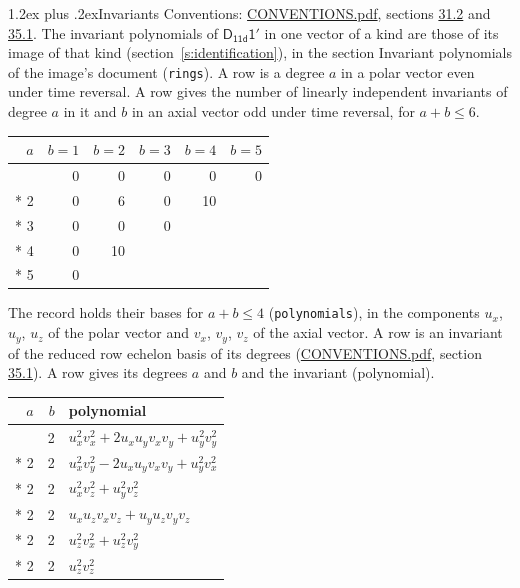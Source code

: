 \documentclass[10pt,a4paper]{article}
\makeatletter
\renewcommand\section{\@startsection{section}{1}{\z@}{-3ex plus -1ex minus -.2ex}%
  {1.2ex plus .2ex}{\normalfont\large\sffamily\bfseries\color{parttitle}}}
\numberwithin{equation}{section}
\newcommand{\grp}[1]{\mathsf{#1}}
\makeatother
\begin{document}
\section{Invariants}\label{s:invariants}
Conventions: \href{../../CONVENTIONS.pdf}{CONVENTIONS.pdf}, sections \href{../../CONVENTIONS.pdf\#conv.31.2}{31.2} and \href{../../CONVENTIONS.pdf\#conv.35.1}{35.1}.
The invariant polynomials of $\grp{D_{11d}1'}$ in one vector of a kind are those of its image of that kind (section~\ref{s:identification}), in the section Invariant polynomials of the image's document (\texttt{rings}).
\leavevmode\label{n:index.degree.polar}\label{n:index.degree.axial}A row is a degree $a$ in a polar vector even under time reversal. A row gives the number of linearly independent invariants of degree $a$ in it and $b$ in an axial vector odd under time reversal, for $a + b \le 6$.
{\small\begin{longtable}{@{}rrrrrr@{}}\toprule
$a$ & $b = 1$ & $b = 2$ & $b = 3$ & $b = 4$ & $b = 5$\\\midrule\endhead
\bottomrule\endfoot\endlastfoot
1 & 0 & 0 & 0 & 0 & 0\\*
2 & 0 & 6 & 0 & 10 & \\*
3 & 0 & 0 & 0 &  & \\*
4 & 0 & 10 &  &  & \\*
5 & 0 &  &  &  & \\
\bottomrule\end{longtable}}
\leavevmode\label{n:local.component.polar}\label{n:local.component.axial}The record holds their bases for $a + b \le 4$ (\texttt{polynomials}), in the components $u_{x}$, $u_{y}$, $u_{z}$ of the polar vector and $v_{x}$, $v_{y}$, $v_{z}$ of the axial vector. \label{n:head.polynomial}A row is an invariant of the reduced row echelon basis of its degrees (\href{../../CONVENTIONS.pdf}{CONVENTIONS.pdf}, section \href{../../CONVENTIONS.pdf\#conv.35.1}{35.1}). A row gives its degrees $a$ and $b$ and the invariant (polynomial).
{\small\renewcommand{\arraystretch}{1.2}\begin{longtable}{@{}rrl@{}}\toprule
$a$ & $b$ & polynomial\\\midrule\endhead
\bottomrule\endfoot\endlastfoot
2 & 2 & $u_{x}^{2}v_{x}^{2} + 2u_{x}u_{y}v_{x}v_{y} + u_{y}^{2}v_{y}^{2}$\\*
2 & 2 & $u_{x}^{2}v_{y}^{2} - 2u_{x}u_{y}v_{x}v_{y} + u_{y}^{2}v_{x}^{2}$\\*
2 & 2 & $u_{x}^{2}v_{z}^{2} + u_{y}^{2}v_{z}^{2}$\\*
2 & 2 & $u_{x}u_{z}v_{x}v_{z} + u_{y}u_{z}v_{y}v_{z}$\\*
2 & 2 & $u_{z}^{2}v_{x}^{2} + u_{z}^{2}v_{y}^{2}$\\*
2 & 2 & $u_{z}^{2}v_{z}^{2}$\\
\bottomrule\end{longtable}}
\end{document}
